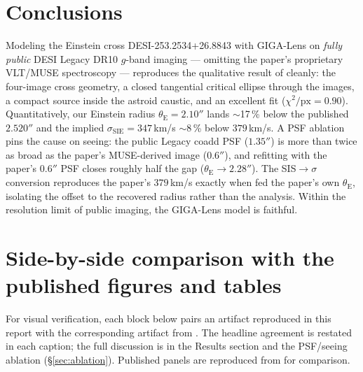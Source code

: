 \documentclass[11pt,letterpaper]{article}
\newcommand{\thetaE}{\ensuremath{\theta_{\mathrm{E}}}}
\newcommand{\sigmaSIE}{\ensuremath{\sigma_{\mathrm{SIE}}}}
\renewcommand{\arcsec}{\ensuremath{''}}
\begin{document}
\section{Conclusions}

Modeling the Einstein cross DESI-253.2534+26.8843 with GIGA-Lens on
\emph{fully public} DESI Legacy DR10 $g$-band imaging --- omitting the
paper's proprietary VLT/MUSE spectroscopy --- reproduces the qualitative
result of \citet{cikota2023einstein} cleanly: the four-image cross
geometry, a closed tangential critical ellipse through the images, a
compact source inside the astroid caustic, and an excellent fit
($\chi^2/\mathrm{px}=0.90$). Quantitatively, our Einstein radius
$\thetaE = 2.10\arcsec$ lands $\sim$17\,\% below the published
$2.520\arcsec$ and the implied $\sigmaSIE = 347\,$km/s $\sim$8\,\% below
$379\,$km/s. A PSF ablation pins the cause on seeing: the public Legacy
coadd PSF ($1.35\arcsec$) is more than twice as broad as the paper's
MUSE-derived image ($0.6\arcsec$), and refitting with the paper's
$0.6\arcsec$ PSF closes roughly half the gap ($\thetaE\to2.28\arcsec$).
The SIS$\to\sigma$ conversion reproduces the paper's $379\,$km/s exactly
when fed the paper's own $\thetaE$, isolating the offset to the recovered
radius rather than the analysis. Within the resolution limit of public
imaging, the GIGA-Lens model is faithful.

\appendix
\section{Side-by-side comparison with the published figures and tables}
\label{app:compare}

For visual verification, each block below pairs an artifact reproduced in this
report with the corresponding artifact from \citet{cikota2023einstein}. The
headline agreement is restated in each caption; the full discussion is in the
Results section and the PSF/seeing ablation (\S\ref{sec:ablation}). Published
panels are reproduced from \citet{cikota2023einstein} for comparison.
\end{document}
